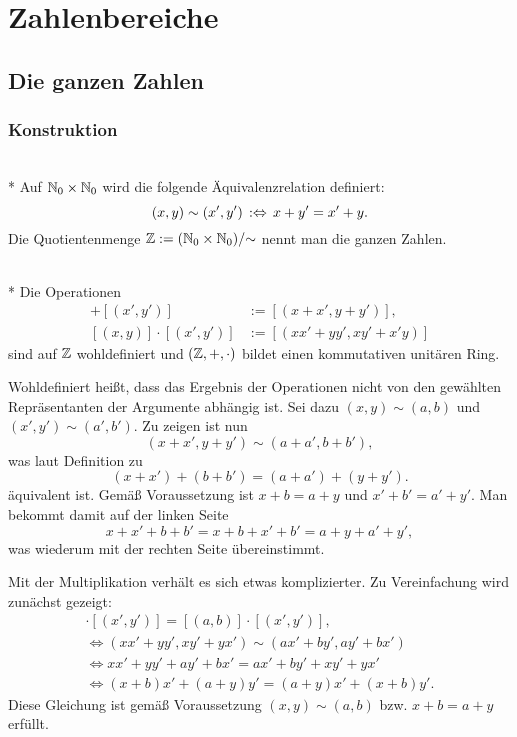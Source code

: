 
\chapter{Zahlenbereiche}

\section{Die ganzen Zahlen}

\subsection{Konstruktion}

\begin{Definition}\mbox{}\\*
Auf $\mathbb N_0\times\mathbb N_0$ wird die folgende Äquivalenzrelation definiert:
\[(x,y)\sim (x',y')\,:\Leftrightarrow\, x+y' = x'+y.\]
Die Quotientenmenge $\mathbb Z := (\mathbb N_0\times\mathbb N_0)/{\sim}$ nennt man
die ganzen Zahlen.
\end{Definition}

\begin{Satz}\mbox{}\\*
Die Operationen
\begin{align*}
[(x,y)]+[(x',y')] &:= [(x+x',y+y')],\\
[(x,y)]\cdot [(x',y')] &:= [(xx'+yy',xy'+x'y)]
\end{align*}
sind auf $\mathbb Z$ wohldefiniert und $(\mathbb Z,+,\cdot)$ bildet einen
kommutativen unitären Ring.
\end{Satz}
 Wohldefiniert heißt, dass das Ergebnis der Operationen
nicht von den gewählten Repräsentanten der Argumente abhängig ist.
Sei dazu $(x,y)\sim(a,b)$ und
$(x',y')\sim (a',b')$. Zu zeigen ist nun
\[(x+x',y+y')\sim (a+a',b+b'),\]
was laut Definition zu
\[(x+x')+(b+b') = (a+a')+(y+y').\]
äquivalent ist. Gemäß Voraussetzung ist $x+b=a+y$ und $x'+b'=a'+y'$.
Man bekommt damit auf der linken Seite
\[x+x'+b+b' = x+b+x'+b' = a+y+a'+y',\]
was wiederum mit der rechten Seite übereinstimmt.

Mit der Multiplikation verhält es sich etwas komplizierter.
Zu Vereinfachung wird zunächst gezeigt:
\begin{gather*}
[(x,y)]\cdot [(x',y')] = [(a,b)]\cdot [(x',y')],\\
\iff (xx'+yy',xy'+yx')\sim (ax'+by',ay'+bx')\\
\iff xx'+yy' + ay'+bx' = ax'+by' + xy'+yx'\\
\iff (x+b)x' + (a+y)y' = (a+y)x' + (x+b)y'.
\end{gather*}
Diese Gleichung ist gemäß Voraussetzung $(x,y)\sim (a,b)$
bzw. $x+b=a+y$ erfüllt.

